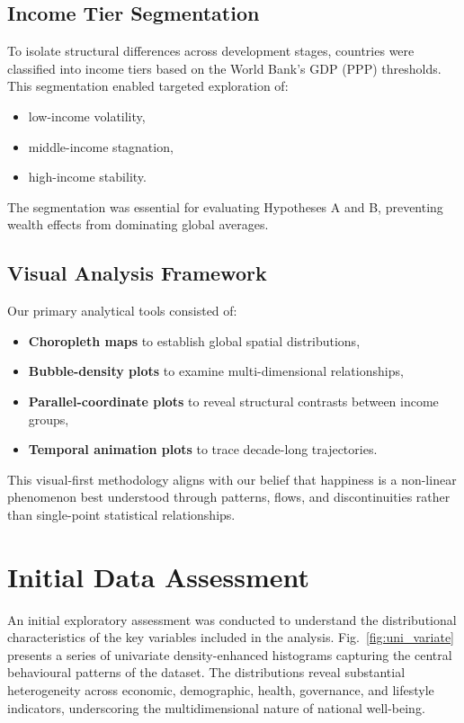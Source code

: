 \documentclass[conference]{IEEEtran}
\begin{document}
\subsection{Income Tier Segmentation}
To isolate structural differences across development stages, countries were classified into income tiers based on the World Bank’s GDP (PPP) thresholds. This segmentation enabled targeted exploration of:
\begin{itemize}
    \item low-income volatility,
    \item middle-income stagnation,
    \item high-income stability.
\end{itemize}
The segmentation was essential for evaluating Hypotheses A and B, preventing wealth effects from dominating global averages.

\subsection{Visual Analysis Framework}
Our primary analytical tools consisted of:
\begin{itemize}
    \item \textbf{Choropleth maps} to establish global spatial distributions,
    \item \textbf{Bubble-density plots} to examine multi-dimensional relationships,
    \item \textbf{Parallel-coordinate plots} to reveal structural contrasts between income groups,
    \item \textbf{Temporal animation plots} to trace decade-long trajectories.
\end{itemize}

This visual-first methodology aligns with our belief that happiness is a non-linear phenomenon best understood through patterns, flows, and discontinuities rather than single-point statistical relationships.
\section*{Initial Data Assessment}

An initial exploratory assessment was conducted to understand the distributional characteristics of the key variables included in the analysis. Fig.~\ref{fig:uni_variate} presents a series of univariate density-enhanced histograms capturing the central behavioural patterns of the dataset. The distributions reveal substantial heterogeneity across economic, demographic, health, governance, and lifestyle indicators, underscoring the multidimensional nature of national well-being.
\end{document}
